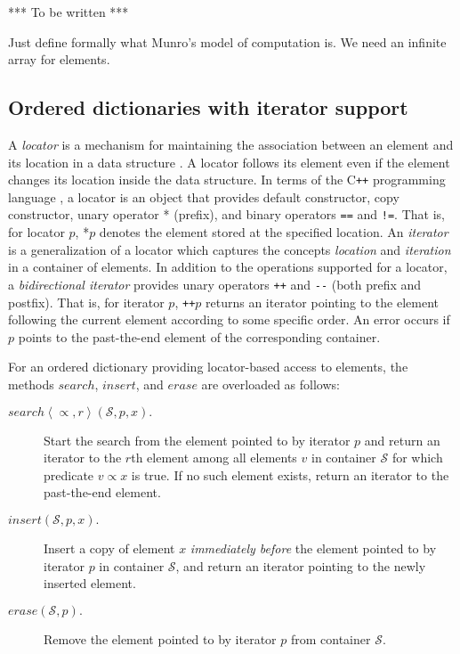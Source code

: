 \documentclass{DIKU-article}
\newcommand{\Search}{\mbox{$\mathit{search}$}}
\newcommand{\sequence}[1]{\left\langle#1\right\rangle}
\newcommand{\Erase}{\mbox{$\mathit{erase}$}}
\newcommand{\Insert}{\mbox{$\mathit{insert}$}}
\begin{document}
*** To be written ***

Just define formally what Munro's model of computation is. We need an
infinite array for elements.

\subsection*{Ordered dictionaries with iterator support}

A \emph{locator} is a mechanism for maintaining the association
between an element and its location in a data structure \cite[Section
6.4]{GT98}. A locator follows its element even if the element changes
its location inside the data structure. In terms of the C\texttt{++}
programming language \cite{ISO}, a locator is an object that provides
default constructor, copy constructor, unary operator * (prefix), and
binary operators \texttt{==} and \texttt{!=}. That is, for
locator $p$, *$p$ denotes the element stored at the specified
location.  An \emph{iterator} is a generalization of a locator which
captures the concepts \textit{location} and \textit{iteration} in a
container of elements. In addition to the operations supported for a
locator, a \emph{bidirectional iterator} provides
unary operators \texttt{++} and \texttt{-}\texttt{-} (both prefix and
postfix). That is,
for iterator $p$, \texttt{++}$p$ returns an iterator pointing to the
element following the current element according to some
specific order. An error occurs if $p$ points to the past-the-end
element of the corresponding container.

For an ordered dictionary providing locator-based access to elements,
the methods \Search{}, \Insert{}, and
\Erase{} are overloaded as follows:
\begin{description}
\item[$\Search\sequence{\propto, r}(\mathcal{S}, p, x).$] 
Start the search from the element pointed to by iterator $p$ and return
an iterator to the $r$th element among all elements $v$ in container
$\mathcal{S}$ for which predicate $v \propto x$ is true. If no such
element exists,  return an iterator to the past-the-end element.

\item[\Insert{}$(\mathcal{S}, p, x).$] Insert a copy of element $x$
\emph{immediately before} the element pointed to by iterator $p$ in
container $\mathcal{S}$, and return an iterator pointing to the newly inserted element.

\item[\Erase{}$(\mathcal{S}, p).$] Remove the element pointed to by iterator $p$
from container $\mathcal{S}$.
\end{description}
\end{document}
